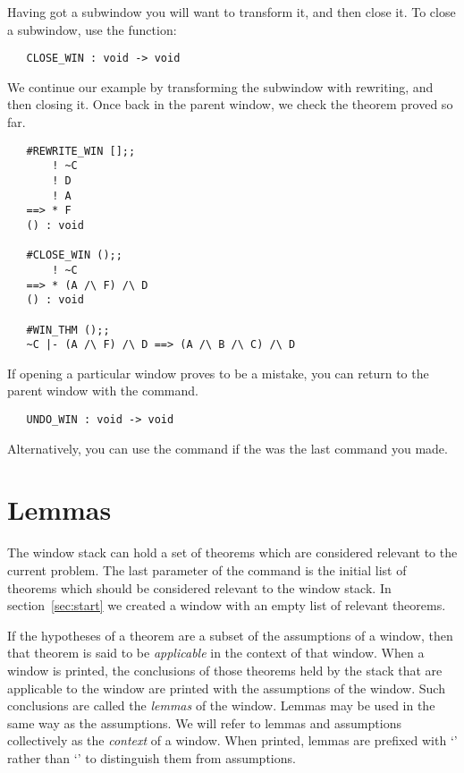 Having got a subwindow you will want to transform it, and then close it.
To close a subwindow, use the function:
\begin{boxed}\begin{verbatim}
   CLOSE_WIN : void -> void
\end{verbatim}\end{boxed}
We continue our example by transforming the subwindow with rewriting,
and then closing it.
Once back in the parent window, we check the theorem proved so far.
\begin{session}\begin{verbatim}
   #REWRITE_WIN [];;
       ! ~C
       ! D
       ! A
   ==> * F
   () : void
   
   #CLOSE_WIN ();;
       ! ~C
   ==> * (A /\ F) /\ D
   () : void
   
   #WIN_THM ();;
   ~C |- (A /\ F) /\ D ==> (A /\ B /\ C) /\ D
\end{verbatim}\end{session}

If opening a particular window proves to be a mistake,
you can return to the parent window with the  command.
\begin{boxed}\begin{verbatim}
   UNDO_WIN : void -> void
\end{verbatim}\end{boxed}
Alternatively, you can use the  command
if the 
was the last command you made.

\section{Lemmas}	\label{sec:lem}

The window stack can hold a set of theorems which are considered relevant
to the current problem.
The last parameter of the  command is the initial list of
theorems which should be considered relevant to the window stack.
In section~\ref{sec:start} we created a window with an empty list of 
relevant theorems.

If the hypotheses of a theorem are a subset of the assumptions of a window,
then that theorem is said to be {\it applicable\/} in the context of that
window.
When a window is printed, the conclusions of those theorems held
by the stack that are applicable to the window are printed 
with the assumptions of the window.
Such conclusions are called the
{\it lemmas}\/ of the window.
Lemmas may be used in the same way as the assumptions.
We will refer to lemmas and assumptions collectively as the {\it context}
of a window.
When printed, lemmas are prefixed with
`\ml{|}' rather than `\ml{!}' to
distinguish them from assumptions.

